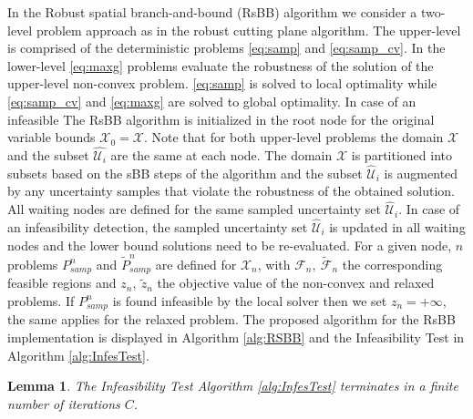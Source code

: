 \documentclass[sn-mathphys-num]{sn-jnl}
\newtheorem{lemma}{Lemma}
\begin{document}
In the Robust spatial branch-and-bound (RsBB) algorithm we consider a two-level problem approach as in the robust cutting plane algorithm. The upper-level is comprised of the deterministic problems \eqref{eq:samp} and \eqref{eq:samp_cv}. In the lower-level \eqref{eq:maxg} problems evaluate the robustness of the solution of the upper-level non-convex problem. \eqref{eq:samp} is solved to local optimality while  \eqref{eq:samp_cv} and \eqref{eq:maxg} are solved to global optimality. In case of an infeasible The RsBB algorithm is initialized in the root node for the original variable bounds $\mathcal{X}_0=\mathcal{X}$. Note that for both upper-level problems the domain $\mathcal{X}$ and the subset $\hat{\mathcal{U}_i}$ are the same at each node. The domain $\mathcal{X}$ is partitioned into subsets based on the sBB steps of the algorithm and the subset $\hat{\mathcal{U}}_i$ is augmented by any uncertainty samples that violate the robustness of the obtained solution. All waiting nodes are defined for the same sampled uncertainty set $\hat{\mathcal{U}}_i$. In case of an infeasibility detection, the sampled uncertainty set $\hat{\mathcal{U}}_i$ is updated in all waiting nodes and the lower bound solutions need to be re-evaluated. For a given node, $n$ problems $P_{samp}^n$ and $\tilde{P}_{samp}^n$ are defined for $\mathcal{X}_n$, with $\mathcal{F}_n, ~\tilde{\mathcal{F}}_n$  the corresponding feasible regions and $z_n,~\tilde{z}_n$ the objective value of the non-convex and relaxed problems. If $P_{samp}^n$ is found infeasible by the local solver then we set $z_n=+\infty$, the same applies for the relaxed problem. The proposed algorithm for the RsBB implementation is displayed in Algorithm \ref{alg:RSBB} and the Infeasibility Test in Algorithm \ref{alg:InfesTest}.

\begin{lemma}\label{lem:infe_term}
The Infeasibility Test Algorithm \ref{alg:InfesTest} terminates in a finite number of iterations $C$.
\end{lemma}
\end{document}
